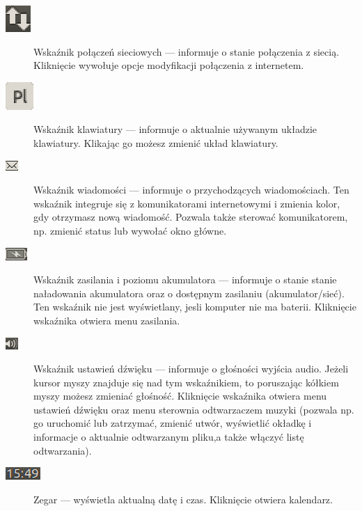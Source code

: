 \begin{description}
\item[\includegraphics{images/unity_wskaznik_siec.png}]\textcolor{ubuntu_orange}{Wskaźnik połączeń sieciowych} --- informuje o stanie połączenia z siecią. Kliknięcie wywołuje opcje modyfikacji połączenia z internetem.
\item[\includegraphics{images/unity_wskaznik_klawiatura.png}]\textcolor{ubuntu_orange}{Wskaźnik klawiatury} --- informuje o aktualnie używanym układzie klawiatury. Klikając go możesz zmienić układ klawiatury.
\item[\includegraphics{images/unity_wskaznik_wiadomosci.png}]\textcolor{ubuntu_orange}{Wskaźnik wiadomości} --- informuje o przychodzących wiadomościach. Ten wskaźnik integruje się z komunikatorami internetowymi i zmienia kolor, gdy otrzymasz nową wiadomość. Pozwala także sterować komunikatorem, np. zmienić status lub wywołać okno główne.
\item[\includegraphics{images/unity_wskaznik_zasilanie.png}]\textcolor{ubuntu_orange}{Wskaźnik zasilania i poziomu akumulatora} --- informuje o stanie stanie naładowania akumulatora oraz o dostępnym zasilaniu (akumulator/sieć). Ten wskaźnik nie jest wyświetlany, jesli komputer nie ma baterii. Kliknięcie wskaźnika otwiera menu zasilania.
\item[\includegraphics{images/unity_wskaznik_dzwiek.png}]\textcolor{ubuntu_orange}{Wskaźnik ustawień dźwięku} --- informuje o głośności wyjścia audio. Jeżeli kursor myszy znajduje się nad tym wskaźnikiem, to poruszając kółkiem myszy możesz zmieniać głośność. Kliknięcie wskaźnika otwiera menu ustawień dźwięku oraz menu sterownia odtwarzaczem muzyki (pozwala np. go uruchomić lub zatrzymać, zmienić utwór, wyświetlić okładkę i informacje o aktualnie odtwarzanym pliku,a także włączyć listę odtwarzania).
\item[\includegraphics{images/unity_wskaznik_zegar.png}]\textcolor{ubuntu_orange}{Zegar} --- wyświetla aktualną datę i czas. Kliknięcie otwiera kalendarz.

\end{description}
